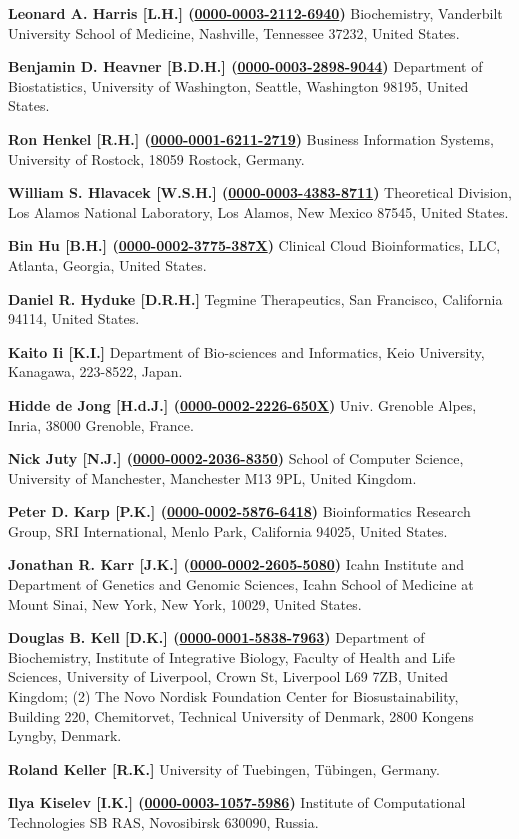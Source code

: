 \documentclass{sbml-paper}
\newcommand{\orcid}[1]{\href{https://orcid.org/#1}{#1}}
\begin{document}
\textbf{Leonard A. Harris [L.H.] (\orcid{0000-0003-2112-6940})} Biochemistry, Vanderbilt University School of Medicine, Nashville, Tennessee 37232, United States.

\textbf{Benjamin D. Heavner [B.D.H.] (\orcid{0000-0003-2898-9044})} Department of Biostatistics, University of Washington, Seattle, Washington 98195, United States.

\textbf{Ron Henkel [R.H.] (\orcid{0000-0001-6211-2719})} Business Information Systems, University of Rostock, 18059 Rostock, Germany.

\textbf{William S. Hlavacek [W.S.H.] (\orcid{0000-0003-4383-8711})} Theoretical Division, Los Alamos National Laboratory, Los Alamos, New Mexico 87545, United States.

\textbf{Bin Hu [B.H.] (\orcid{0000-0002-3775-387X})} Clinical Cloud Bioinformatics, LLC, Atlanta, Georgia, United States.

\textbf{Daniel R. Hyduke [D.R.H.]} Tegmine Therapeutics, San Francisco, California 94114, United States.

\textbf{Kaito Ii [K.I.]} Department of Bio-sciences and Informatics, Keio University, Kanagawa, 223-8522, Japan.

\textbf{Hidde de Jong [H.d.J.] (\orcid{0000-0002-2226-650X})} Univ. Grenoble Alpes, Inria, 38000 Grenoble, France.

\textbf{Nick Juty [N.J.] (\orcid{0000-0002-2036-8350})} School of Computer Science, University of Manchester, Manchester M13 9PL, United Kingdom.

\textbf{Peter D. Karp [P.K.] (\orcid{0000-0002-5876-6418})} Bioinformatics Research Group, SRI International, Menlo Park, California 94025, United States.

\textbf{Jonathan R. Karr [J.K.] (\orcid{0000-0002-2605-5080})} Icahn Institute and Department of Genetics and Genomic Sciences, Icahn School of Medicine at Mount Sinai, New York, New York, 10029, United States.

\textbf{Douglas B. Kell [D.K.] (\orcid{0000-0001-5838-7963})} Department of Biochemistry, Institute of Integrative Biology, Faculty of Health and Life Sciences, University of Liverpool, Crown St, Liverpool L69 7ZB, United Kingdom; (2) The Novo Nordisk Foundation Center for Biosustainability, Building 220, Chemitorvet, Technical University of Denmark, 2800 Kongens Lyngby, Denmark.

\textbf{Roland Keller [R.K.]} University of Tuebingen, Tübingen, Germany.

\textbf{Ilya Kiselev [I.K.] (\orcid{0000-0003-1057-5986})} Institute of Computational Technologies SB RAS, Novosibirsk 630090, Russia.
\end{document}
